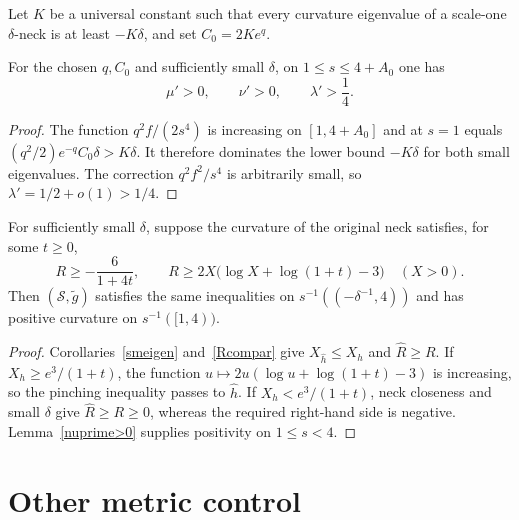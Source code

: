 Let $K$ be a universal constant such that every curvature eigenvalue of a
scale-one $\delta$-neck is at least $-K\delta$, and set
$C_0=2Ke^q$.

\begin{lemma}
\label{lem:positive-eigenvalues-surgery-region}
\label{nuprime>0}
For the chosen $q,C_0$ and sufficiently small $\delta$, on
$1\leq s\leq4+A_0$ one has
\[
  \mu'>0,\qquad\nu'>0,\qquad\lambda'>\frac14.
\]
\end{lemma}

\begin{proof}
\sketch
The function $q^2f/(2s^4)$ is increasing on $[1,4+A_0]$ and at $s=1$ equals
$(q^2/2)e^{-q}C_0\delta>K\delta$. It therefore dominates the lower bound
$-K\delta$ for both small eigenvalues. The correction
$q^2f^2/s^4$ is arbitrarily small, so $\lambda'=1/2+o(1)>1/4$.
\end{proof}

\begin{proposition}
\label{prop:pinching-preserved-s-less-4}
For sufficiently small $\delta$, suppose the curvature of the original neck
satisfies, for some $t\geq0$,
\[
  R\geq-\frac6{1+4t},
  \qquad
  R\geq2X\bigl(\log X+\log(1+t)-3\bigr)
  \quad(X>0).
\]
Then $({\mathcal S},\widetilde g)$ satisfies the same inequalities on
$s^{-1}(( -\delta^{-1},4))$ and has positive curvature on
$s^{-1}([1,4))$.
\end{proposition}

\begin{proof}
\sketch
{}
Corollaries~\ref{smeigen} and~\ref{Rcompar} give
$X_{\widehat h}\leq X_h$ and $\widehat R\geq R$. If
$X_h\geq e^3/(1+t)$, the function
$u\mapsto2u(\log u+\log(1+t)-3)$ is increasing, so the pinching inequality
passes to $\widehat h$. If $X_h<e^3/(1+t)$, neck closeness and small $\delta$
give $\widehat R\geq R\geq0$, whereas the required right-hand side is
negative. Lemma~\ref{nuprime>0} supplies positivity on $1\leq s<4$.
\end{proof}

\section{Other metric control}

